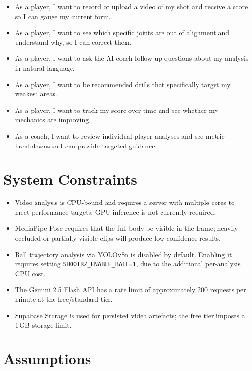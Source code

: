 \begin{itemize}
  \item As a player, I want to record or upload a video of my shot and receive a score so I can gauge my current form.
  \item As a player, I want to see which specific joints are out of alignment and understand why, so I can correct them.
  \item As a player, I want to ask the AI coach follow-up questions about my analysis in natural language.
  \item As a player, I want to be recommended drills that specifically target my weakest areas.
  \item As a player, I want to track my score over time and see whether my mechanics are improving.
  \item As a coach, I want to review individual player analyses and see metric breakdowns so I can provide targeted guidance.
\end{itemize}

\section{System Constraints}
\label{sec:constraints}

\begin{itemize}
  \item Video analysis is CPU-bound and requires a server with multiple cores to meet performance targets; GPU inference is not currently required.
  \item MediaPipe Pose requires that the full body be visible in the frame; heavily occluded or partially visible clips will produce low-confidence results.
  \item Ball trajectory analysis via YOLOv8n is disabled by default. Enabling it requires setting \lstinline|SHOOTRZ_ENABLE_BALL=1|, due to the additional per-analysis CPU cost.
  \item The Gemini 2.5 Flash API has a rate limit of approximately 200 requests per minute at the free/standard tier.
  \item Supabase Storage is used for persisted video artefacts; the free tier imposes a 1\,GB storage limit.
\end{itemize}

\section{Assumptions}
\label{sec:assumptions}

